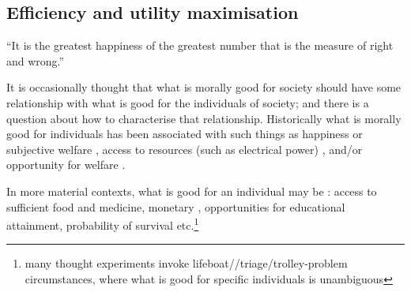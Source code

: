 \subsection{Efficiency and utility maximisation}\label{sec:philosophy_efficiency}

\DIFdelbegin %

\DIFdelend \begin{displayquote}``It is the greatest happiness of the greatest number that is the measure of right and wrong.'' \citep{bentham2001fragment}
\end{displayquote} 

\DIFaddbegin \begin{displayquote}
\end{displayquote}

\DIFaddend It is occasionally thought that what is morally good for society should have some relationship with what is good for the individuals of society; and there is a question about how to characterise that relationship.
Historically what is morally good for individuals has been associated with such things as happiness \citep{burns2005happiness} or subjective welfare \citep{10.2307/2264894}, access to resources (such as electrical power) \citep{10.2307/2265047}, and/or opportunity for welfare \citep{10.2307/4320203}.%

In more \DIFaddbegin {}\DIFaddend material contexts, what is good for an individual may be \DIFdelbegin {}\DIFdelend \DIFaddbegin {}\DIFaddend : access to sufficient food and medicine, monetary \DIFdelbegin {}\DIFdelend \DIFaddbegin {}\DIFaddend , opportunities for educational attainment, probability of survival etc.\footnote{many thought experiments invoke lifeboat/\DIFdelbegin {}\DIFdelend \DIFaddbegin {}\DIFaddend /triage/trolley-problem circumstances, where what is good for specific individuals is unambiguous}
\DIFdelbegin %


